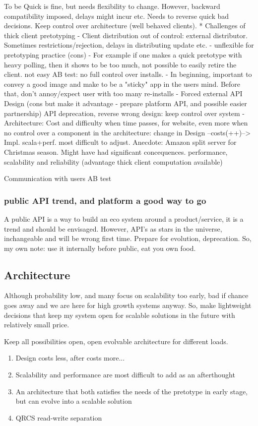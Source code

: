 \documentclass[a4paper,10pt]{book}
\begin{document}
To be Quick is fine, but needs flexibility to change. However, backward compatibility imposed, delays might incur etc.
Needs to reverse quick bad decisions. Keep control over architecture (well behaved clients).
 * Challenges of thick client pretotyping
 - Client distribution out of control: external distributor. Sometimes restrictions/rejection, delays in distributing update etc.
 - unflexible for pretotyping practice (cons)
    - For example if one makes a quick pretotype with heavy polling, then it shows to be too much, not possible to easily retire the client.
   not easy AB test: no full control over installs. 
 - In beginning, important to convey a good image and make to be a "sticky" app in the users mind. Before that, don't annoy/expect user
   with too many re-installs
 - Forced external API Design (cons but make it advantage - prepare platform API, and possible easier partnership)
    API deprecation, reverse wrong design: keep control over system
 - Architecture: 
    Cost and difficulty when time passes, for website, even more when no control over a component in the architecture:
      change in Design --costs(++)--> Impl.
      scala+perf. most difficult to adjust. Anecdote: Amazon split server for Christmas season. Might have had significant concequences.
    performance, scalability and reliability (advantage thick client computation available)


Communication with users
AB test

\subsubsection{public API trend, and platform a good way to go}
A public API is a way to build an eco system around a product/service, it is a trend and should be envisaged.
However, API's as stars in the universe, inchangeable and will be wrong first time.
Prepare for evolution, deprecation.
So, my own note: use it internally before public, eat you own food.

\subsection{Architecture}
Although probability low, and many focus on scalability too early, bad if chance goes away and we are here for high growth systems anyway.
So, make lightweight decisions that keep my system open for scalable solutions in the future with relatively small price.

Keep all possibilities open, open evolvable architecture for different loads.
\begin{enumerate}
\item Design costs less, after costs more...
\item Scalability and performance are most difficult to add as an afterthought
\item An architecture that both satisfies the needs of the pretotype in early stage, but can evolve
    into a scalable solution
\item QRCS read-write separation
\end{enumerate}
\end{document}
